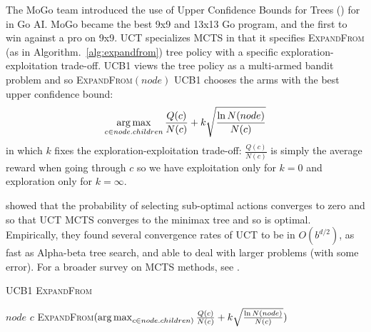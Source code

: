 The MoGo team \citep{GellyUCT, Gelly2006, GellySchoenauer} introduced the use of Upper Confidence Bounds for Trees () for  in Go AI. MoGo became the best 9x9 and 13x13 Go program, and the first to win against a pro on 9x9. UCT specializes MCTS in that it specifies \textsc{ExpandFrom} (as in Algorithm.~\ref{alg:expandfrom}) tree policy with a specific exploration-exploitation trade-off. UCB1 \citep{BanditBased} views the tree policy as a multi-armed bandit problem and so \textsc{ExpandFrom}$(node)$ UCB1 chooses the arms with the best upper confidence bound: $$\operatorname*{arg\,max}_{c \in node.children} \frac{Q(c)}{N(c)}+k\sqrt{\frac{\ln N(node)}{N(c)}}$$ in which $k$ fixes the exploration-exploitation trade-off: $\frac{Q(c)}{N(c)}$ is simply the average reward when going through $c$ so we have exploitation only for $k=0$ and exploration only for $k=\infty$.

\citet{BanditBased} showed that the probability of selecting sub-optimal actions converges to zero and so that UCT MCTS converges to the minimax tree and so is optimal. Empirically, they found several convergence rates of UCT to be in $O(b^{d/2})$, as fast as Alpha-beta tree search, and able to deal with larger problems (with some error). For a broader survey on MCTS methods, see \citep{MCTSsurvey}.

\begin{algorithm}
\caption{UCB1 \textsc{ExpandFrom}}
\label{alg:expandfrom}
\begin{algorithmic}
        \State \Return $node$ 
    \EndIf
        \State \Return $c$ 
    \EndIf
    \State \Return \textsc{ExpandFrom}$(\operatorname*{arg\,max}_{c \in node.children)} \frac{Q(c)}{N(c)}+k\sqrt{\frac{\ln N(node)}{N(c)}})$ 
\EndFunction 
\end{algorithmic}
\end{algorithm}

